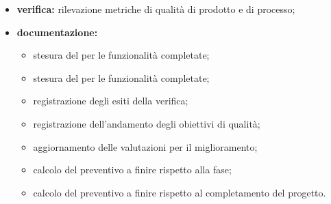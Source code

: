 \begin{itemize}
 	\item \textbf{verifica:} rilevazione metriche di qualità di prodotto e di processo;
	\item \textbf{documentazione:} 
	 \begin{itemize}
		\item stesura del \MU{} per le funzionalità completate;
		\item stesura del \MS{} per le funzionalità completate;
  		\item registrazione degli esiti della verifica;
     	\item registrazione dell’andamento degli obiettivi di qualità;
		\item aggiornamento delle valutazioni per il miglioramento; 
		\item calcolo del preventivo a finire rispetto alla fase;
		\item calcolo del preventivo a finire rispetto al completamento del progetto.
	 \end{itemize}
\end{itemize}

\pagebreak

